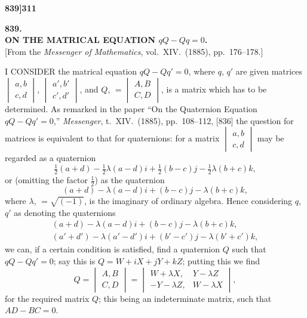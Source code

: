 \documentclass[11pt,a4paper]{book}
\begin{document}
\vspace{2em}


\newpage
\setcounter{page}{311}

\noindent\textbf{839]}\hfill\textbf{311}

\bigskip

\begin{center}
{\Large\textbf{839.}}\\[1em]
{\large\textbf{ON THE MATRICAL EQUATION $qQ - Qq = 0$.}}\\[1em]
[From the \textit{Messenger of Mathematics}, vol.\ XIV.\ (1885), pp.\ 176--178.]
\end{center}

\bigskip

\noindent I CONSIDER the matrical equation $qQ - Qq' = 0$, where $q$, $q'$ are given matrices $\begin{vmatrix} a, b \\ c, d \end{vmatrix}$, $\begin{vmatrix} a', b' \\ c', d' \end{vmatrix}$, and $Q$, $= \begin{vmatrix} A, B \\ C, D \end{vmatrix}$, is a matrix which has to be determined. As remarked in the paper ``On the Quaternion Equation $qQ - Qq' = 0$,'' \textit{Messenger}, t.\ XIV.\ (1885), pp.\ 108--112, [836] the question for matrices is equivalent to that for quaternions: for a matrix $\begin{vmatrix} a, b \\ c, d \end{vmatrix}$ may be regarded as a quaternion
\[
\tfrac{1}{2}(a + d) - \tfrac{1}{2}\lambda(a - d)i + \tfrac{1}{2}(b - c)j - \tfrac{1}{2}\lambda(b + c)k,
\]
or (omitting the factor $\tfrac{1}{2}$) as the quaternion
\[
(a + d) - \lambda(a - d)i + (b - c)j - \lambda(b + c)k,
\]
where $\lambda$, $= \sqrt{(-1)}$, is the imaginary of ordinary algebra. Hence considering $q$, $q'$ as denoting the quaternions
\begin{align*}
(a + d) - \lambda(a - d)i + (b - c)j - \lambda(b + c)k, \\
(a' + d') - \lambda(a' - d')i + (b' - c')j - \lambda(b' + c')k,
\end{align*}
we can, if a certain condition is satisfied, find a quaternion $Q$ such that $qQ - Qq' = 0$; say this is $Q = W + iX + jY + kZ$; putting this we find
\[
Q = \begin{vmatrix} A, B \\ C, D \end{vmatrix} = \begin{vmatrix} W + \lambda X, & Y - \lambda Z \\ -Y - \lambda Z, & W - \lambda X \end{vmatrix},
\]
for the required matrix $Q$; this being an indeterminate matrix, such that $AD - BC = 0$.
\end{document}
